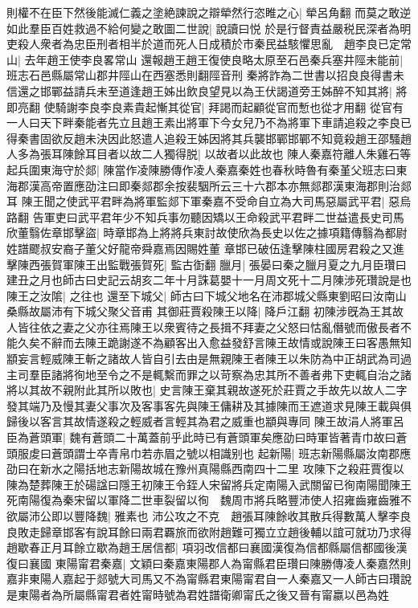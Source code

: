 則權不在臣下然後能滅仁義之塗絶諫說之辯犖然行恣睢之心|{
	犖呂角翻}
而莫之敢逆如此羣臣百姓救過不給何變之敢圖二世說|{
	說讀曰悦}
於是行督責益嚴税民深者為明吏殺人衆者為忠臣刑者相半於道而死人日成積於市秦民益駭懼思亂　趙李良已定常山|{
	去年趙王使李良畧常山}
還報趙王趙王復使良略太原至石邑秦兵塞井陘未能前|{
	班志石邑縣屬常山郡井陘山在西塞悉則翻陘音刑}
秦將詐為二世書以招良良得書未信還之邯鄲益請兵未至道逢趙王姊出飲良望見以為王伏謁道旁王姊醉不知其將|{
	將即亮翻}
使騎謝李良李良素貴起慚其從官|{
	拜謁而起顧從官而慙也從才用翻}
從官有一人曰天下畔秦能者先立且趙王素出將軍下今女兒乃不為將軍下車請追殺之李良已得秦書固欲反趙未決因此怒遣人追殺王姊因將其兵襲邯鄲邯鄲不知竟殺趙王邵騷趙人多為張耳陳餘耳目者以故二人獨得脱|{
	以故者以此故也}
陳人秦嘉符離人朱雞石等起兵圍東海守於郯|{
	陳當作凌陳勝傳作凌人秦嘉秦姓也春秋時魯有秦堇父班志曰東海郡漢高帝置應劭注曰即秦郯郡余按裴駰所云三十六郡本亦無郯郡漢東海郡則治郯耳}
陳王聞之使武平君畔為將軍監郯下軍秦嘉不受命自立為大司馬惡屬武平君|{
	惡烏路翻}
告軍吏曰武平君年少不知兵事勿聽因矯以王命殺武平君畔二世益遣長史司馬欣董翳佐章邯擊盜|{
	時章邯為上將將兵東討故使欣為長史以佐之據項籍傳翳為都尉姓譜飂叔安裔子董父好龍帝舜嘉焉因賜姓董}
章邯已破伍逢擊陳柱國房君殺之又進擊陳西張賀軍陳王出監戰張賀死|{
	監古衘翻}
臘月|{
	張晏曰秦之臘月夏之九月臣瓚曰建丑之月也師古曰史記云胡亥二年十月誅葛嬰十一月周文死十二月陳涉死瓚說是也}
陳王之汝隂|{
	之往也}
還至下城父|{
	師古曰下城父地名在沛郡城父縣東劉昭曰汝南山桑縣故屬沛有下城父聚父音甫}
其御莊賈殺陳王以降|{
	降戶江翻}
初陳涉旣為王其故人皆往依之妻之父亦往焉陳王以衆賓待之長揖不拜妻之父怒曰怙亂僭號而傲長者不能久矣不辭而去陳王跪謝遂不為顧客出入愈益發舒言陳王故情或說陳王曰客愚無知顓妄言輕威陳王斬之諸故人皆自引去由是無親陳王者陳王以朱防為中正胡武為司過主司羣臣諸將徇地至令之不是輒繫而罪之以苛察為忠其所不善者弗下吏輒自治之諸將以其故不親附此其所以敗也|{
	史言陳王棄其親故遂死於莊賈之手故先以故人二字發其端乃及慢其妻父事次及客事客先與陳王傭耕及其據陳而王遮道求見陳王載與俱歸後以客言其故情遂殺之輕威者言輕其為君之威重也顓與專同}
陳王故涓人將軍呂臣為蒼頭軍|{
	魏有蒼頭二十萬蓋前乎此時已有蒼頭軍矣應劭曰時軍皆著青巾故曰蒼頭服䖍曰蒼頭謂士卒青帛巾若赤眉之號以相識别也}
起新陽|{
	班志新陽縣屬汝南郡應劭曰在新水之陽括地志新陽故城在豫州真陽縣西南四十二里}
攻陳下之殺莊賈復以陳為楚葬陳王於碭諡曰隱王初陳王令銍人宋留將兵定南陽入武關留已徇南陽聞陳王死南陽復為秦宋留以軍降二世車裂留以徇　魏周市將兵略豐沛使人招雍齒雍齒雅不欲屬沛公即以豐降魏|{
	雅素也}
沛公攻之不克　趙張耳陳餘收其散兵得數萬人擊李良良敗走歸章邯客有說耳餘曰兩君覉旅而欲附趙難可獨立立趙後輔以誼可就功乃求得趙歇春正月耳餘立歇為趙王居信都|{
	項羽改信都曰襄國漢復為信都縣屬信都國後漢復曰襄國}
東陽甯君秦嘉|{
	文穎曰秦嘉東陽郡人為甯縣君臣瓚曰陳勝傳凌人秦嘉然則嘉非東陽人嘉起于郯號大司馬又不為甯縣君東陽甯君自一人秦嘉又一人師古曰瓚說是東陽者為所屬縣甯君者姓甯時號為君姓譜衛卿甯氏之後又晉有甯嬴以邑為姓}
